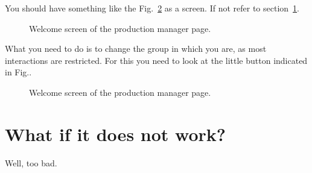 \documentclass[a4paper,12pt]{article}
\begin{document}
You should have something like the Fig.~\ref{fig:welcome} as a screen. If not refer to
section~\ref{sec:problem}.
\begin{figure}[h]
\begin{center}
\end{center}
\caption{Welcome screen of the production manager page.}\label{fig:welcome}
\end{figure}

What you need to do is to change the group in which you are, as most
interactions are restricted. For this you need to look at the little button
indicated in Fig.. 
\begin{figure}[h]
\begin{center}
\end{center}
\caption{Welcome screen of the production manager page.}\label{fig:welcome}
\end{figure}


\section{What if it does not work?}\label{sec:problem}
Well, too bad.
\end{document}
